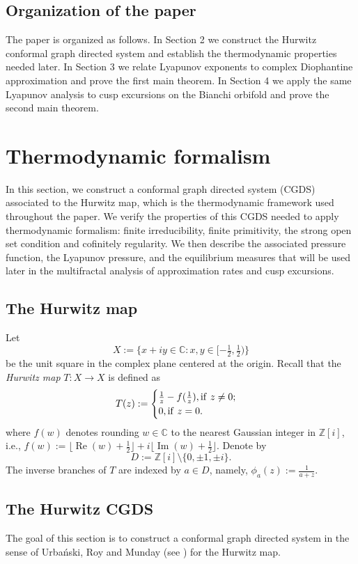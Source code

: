\documentclass[11pt]{amsart}
\theoremstyle{plain}
\theoremstyle{definition}
\renewcommand\~{\tilde}%
\newcommand{\ZZ}{\ensuremath{\mathbb Z}} %
\numberwithin{equation}{section}
\begin{document}
\subsection{Organization of the paper}
The paper is organized as follows. In Section 2 we construct the Hurwitz conformal graph directed system and establish the thermodynamic properties needed later. In Section 3 we relate Lyapunov exponents to complex Diophantine approximation and prove the first main theorem. In Section 4 we apply the same Lyapunov analysis to cusp excursions on the Bianchi orbifold and prove the second main theorem.


\section{Thermodynamic formalism}
In this section, we construct a conformal graph directed system (CGDS) associated to the Hurwitz map, which is the thermodynamic framework used throughout the paper. We verify the properties of this CGDS needed to apply thermodynamic formalism: finite irreducibility, finite primitivity, the strong open set condition and cofinitely regularity. We then describe the associated pressure function, the Lyapunov pressure, and the equilibrium measures that will be used later in the multifractal analysis of approximation rates and cusp excursions.


\subsection{The Hurwitz map}
Let
$$
X := \{x+iy \in \mathbb{C} : x,y \in [-\tfrac12,\tfrac12) \}
$$ 
be the unit square in the complex plane centered at the origin. 
Recall that the \emph{Hurwitz map} $T \colon X \to X$ is defined as
$$
T(z) := \begin{cases}
\frac{1}{z} - f(\frac{1}{z}), {\rm if ~} z \neq 0;\\
0, {\rm if~} z = 0.
\end{cases}
$$
where $f(w)$ denotes rounding $w \in \mathbb{C}$ to the nearest Gaussian integer in $\mathbb{Z}[i]$, i.e., 
$f(w):=\lfloor \operatorname{Re}(w)+\frac12\rfloor
+i\lfloor\operatorname{Im}(w)+\frac12\rfloor.$
Denote by
$$D := \ZZ[i]\setminus \{0,\pm1,\pm i\}.$$
The inverse branches of $T$ are indexed by $a \in D$, namely, $\phi_a(z) :=  \frac{1}{a+z}$.


\subsection{The Hurwitz CGDS}
The goal of this section is to construct a conformal graph directed system in the sense of 
Urba\'nski, Roy and Munday (see \cite[Definition 19.3.1]{Urbanski22}) for the Hurwitz map.
\end{document}
